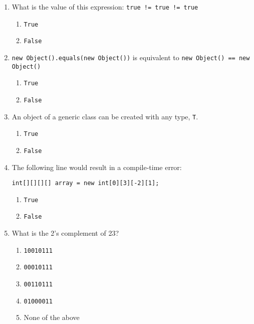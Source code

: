 \documentclass[S17-Final.tex]{subfiles}
\begin{document}
\begin{enumerate}

\item What is the value of this expression: \texttt{true != true != true}

\begin{enumerate}
\item  \texttt{True}  
\item  \texttt{False}
\end{enumerate}

\item \texttt{new Object().equals(new Object())} is equivalent to \texttt{new Object() == new Object()}

\begin{enumerate}
\item  \texttt{True}  
\item  \texttt{False}
\end{enumerate}

\item An object of a generic class can be created with any type, \texttt{T}.

\begin{enumerate}
\item  \texttt{True}  
\item  \texttt{False}
\end{enumerate}

\item The following line would result in a compile-time error:
\begin{lstlisting}
int[][][][] array = new int[0][3][-2][1];
\end{lstlisting}

\begin{enumerate}
\item  \texttt{True}  
\item  \texttt{False}
\end{enumerate}

\item What is the 2’s complement of 23?

\begin{enumerate}
\item  \texttt{10010111}  
\item  \texttt{00010111}
\item  \texttt{00110111}  
\item  \texttt{01000011}
\item  None of the above
\end{enumerate}


\end{enumerate}
\end{document}
